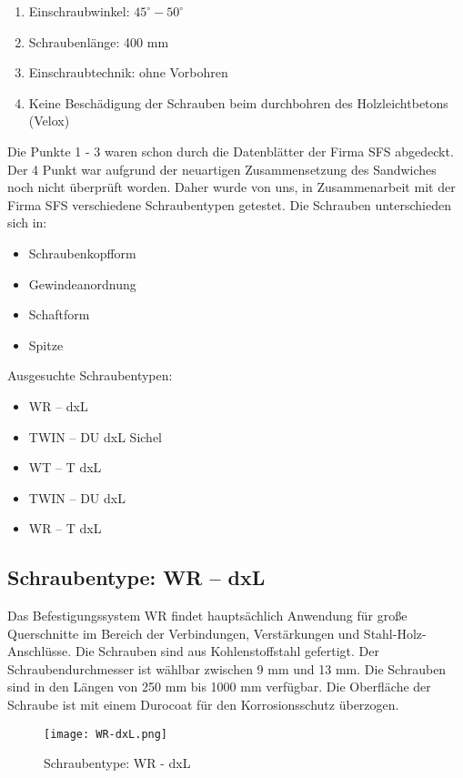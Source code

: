 \documentclass[12 pt,a4 paper ]{scrreprt}
\begin{document}
\begin{enumerate} 
	\item Einschraubwinkel: $45^\circ-50 ^\circ$
	\item Schraubenlänge: 400 mm
	\item Einschraubtechnik: ohne Vorbohren
	\item Keine Beschädigung der Schrauben beim durchbohren des Holzleichtbetons (Velox)
\end{enumerate}

Die Punkte 1 - 3 waren schon durch die Datenblätter der Firma SFS abgedeckt.
Der 4 Punkt war aufgrund der neuartigen Zusammensetzung des Sandwiches noch nicht überprüft worden. Daher wurde von uns, in Zusammenarbeit mit der Firma SFS verschiedene Schraubentypen getestet. 
\newline{}
\newline{}
Die Schrauben unterschieden sich in: 

\begin{itemize}
	\item Schraubenkopfform
	\item Gewindeanordnung
	\item Schaftform
	\item Spitze
\end{itemize}

Ausgesuchte Schraubentypen: 


\begin{itemize}
	\item WR – dxL
	\item TWIN – DU dxL Sichel
	\item WT – T dxL 
	\item TWIN – DU dxL
	\item WR – T  dxL
\end{itemize}
	
\subsection{Schraubentype:	 WR – dxL}
Das Befestigungssystem WR findet hauptsächlich Anwendung für große Querschnitte im Bereich der Verbindungen, Verstärkungen und Stahl-Holz-Anschlüsse. Die Schrauben sind aus Kohlenstoffstahl gefertigt. Der Schraubendurchmesser ist wählbar zwischen 9 mm und 13 mm. Die Schrauben sind in den Längen von  250 mm bis 1000 mm verfügbar. Die Oberfläche der Schraube ist mit einem Durocoat für den Korrosionsschutz überzogen. 

\begin{figure}[h]
\begin{center}
\texttt{[image: WR-dxL.png]}
\caption{Schraubentype: WR - dxL}
\end{center}
\end{figure}
\end{document}
